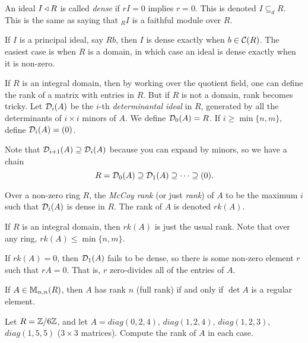  \setcounter{lecture}{1}


  \begin{definition}
   An ideal $I\triangleleft R$ is called \emph{dense} if $rI=0$ implies $r=0$.
   This is denoted $I\subseteq_d R$. This is the same as saying that ${}_RI$ is a
   faithful module over $R$.
 \end{definition}
 If $I$ is a principal ideal, say $Rb$, then $I$ is dense exactly when $b\in \mathcal{C}(R)$. The
 easiest case is when $R$ is a domain, in which case an ideal is dense exactly when it is
 non-zero.

 If $R$ is an integral domain, then by working over the quotient field, one can define
 the rank of a matrix with entries in $R$. But if $R$ is not a domain, rank becomes
 tricky. Let $\mathcal{D}_i(A)$ be the $i$-th \emph{determinantal ideal} in $R$, generated by all
 the determinants of $i\times i$ minors of $A$. We define $\mathcal{D}_0(A)=R$. If $i\ge
 \min\{n,m\}$, define $\mathcal{D}_i(A)=(0)$.

 Note that $\mathcal{D}_{i+1}(A)\supseteq \mathcal{D}_i(A)$ because you can expand by minors, so we have a
 chain
 \[
    R=\mathcal{D}_0(A)\supseteq \mathcal{D}_1(A)\supseteq \cdots \supseteq (0).
 \]
 \begin{definition}
   Over a non-zero ring $R$, the \emph{McCoy rank} (or just \emph{rank}) of $A$ to be
   the maximum $i$ such that $\mathcal{D}_i(A)$ is dense in $R$. The rank of $A$ is denoted
   $rk(A)$.
 \end{definition}
 If $R$ is an integral domain, then $rk(A)$ is just the usual rank. Note that over any
 ring, $rk(A)\le \min\{n,m\}$.

 If $rk(A)=0$, then $\mathcal{D}_1(A)$ fails to be dense, so there is some non-zero element $r$
 such that $rA=0$. That is, $r$ zero-divides all of the entries of $A$.

 If $A\in \mathbb{M}_{n,n}(R)$, then $A$ has rank $n$ (full rank) if and only if $\det A$ is a
 regular element.

 \begin{exercise}
   Let $R=\mathbb{Z}/6\mathbb{Z} $, and let $A=diag(0,2,4)$, $diag(1,2,4)$, $diag(1,2,3)$, $diag(1,5,5)$
   ($3\times 3$ matrices). Compute the rank of $A$ in each case.
 \end{exercise}
 \begin{solution}
 \end{solution}

